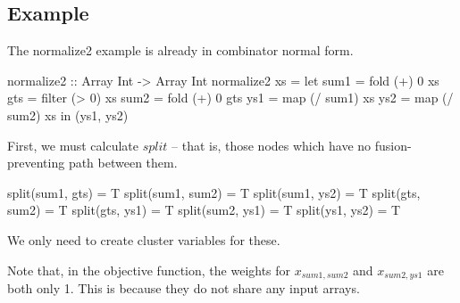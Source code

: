 \subsection{Example}
The normalize2 example is already in combinator normal form.
\begin{code}
 normalize2 :: Array Int -> Array Int
 normalize2 xs
  = let sum1 = fold   (+)  0   xs
        gts  = filter (> 0)    xs
        sum2 = fold   (+)  0   gts
        ys1  = map    (/ sum1) xs
        ys2  = map    (/ sum2) xs
    in (ys1, ys2)
\end{code}

First, we must calculate $split$ -- that is, those nodes which have no fusion-preventing path between them.
\begin{code}
split(sum1, gts)    = T
split(sum1, sum2)   = T
split(sum1, ys2)    = T
split(gts,  sum2)   = T
split(gts,  ys1)    = T
split(sum2, ys1)    = T
split(ys1,  ys2)    = T
\end{code}
We only need to create cluster variables for these.

Note that, in the objective function, the weights for $x_{sum1, sum2}$ and $x_{sum2, ys1}$ are both only 1.
This is because they do not share any input arrays.

